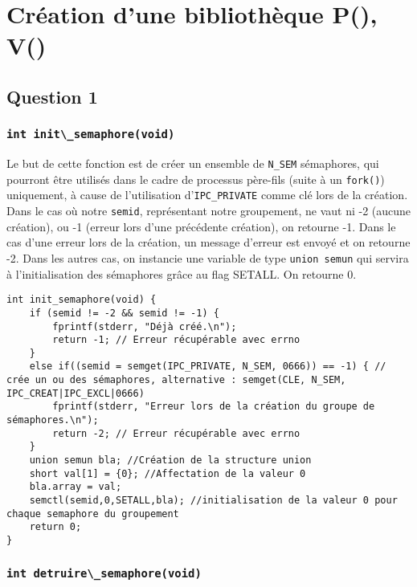 \clanguage

\chapter{Création d'une bibliothèque P(), V()}

\section{Question 1}

\subsection{\lstinline{int init\_semaphore(void)}}

Le but de cette fonction est de créer un ensemble de \lstinline{N_SEM} sémaphores, qui pourront être utilisés dans le cadre de processus père-fils (suite à un \lstinline{fork()}) uniquement, à cause de l'utilisation d'\lstinline{IPC_PRIVATE} comme clé lors de la création. Dans le cas où notre \lstinline{semid}, représentant notre groupement, ne vaut ni -2 (aucune création), ou -1 (erreur lors d'une précédente création), on retourne -1. Dans le cas d'une erreur lors de la création, un message d'erreur est envoyé et on retourne -2.
Dans les autres cas, on instancie une variable de type \lstinline{union semun} qui servira à l'initialisation des sémaphores grâce au flag SETALL. On retourne 0.

\begin{lstlisting}
int init_semaphore(void) {
    if (semid != -2 && semid != -1) {
        fprintf(stderr, "Déjà créé.\n");
        return -1; // Erreur récupérable avec errno
    }
    else if((semid = semget(IPC_PRIVATE, N_SEM, 0666)) == -1) { // crée un ou des sémaphores, alternative : semget(CLE, N_SEM, IPC_CREAT|IPC_EXCL|0666)
        fprintf(stderr, "Erreur lors de la création du groupe de sémaphores.\n");
        return -2; // Erreur récupérable avec errno
    }
    union semun bla; //Création de la structure union
    short val[1] = {0}; //Affectation de la valeur 0
    bla.array = val;
    semctl(semid,0,SETALL,bla); //initialisation de la valeur 0 pour chaque semaphore du groupement
    return 0;
}
\end{lstlisting}

\subsection{\lstinline{int detruire\_semaphore(void)}}

